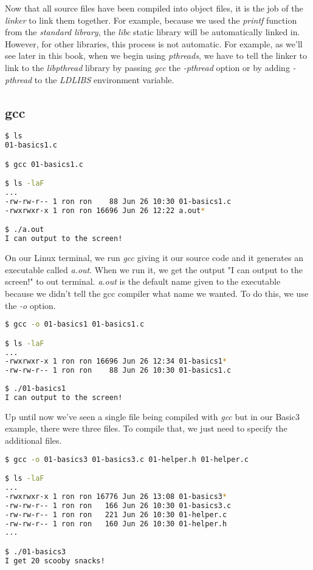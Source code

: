 \documentclass[../main.tex]{subfiles}
\begin{document}
Now that all source files have been compiled into object files, it is the job of the \textit{linker} to link them together.  For example, because we used the \textit{printf} function from the \textit{standard library}, the \textit{libc} static library will be automatically linked in.  However, for other libraries, this process is not automatic.  For example, as we'll see later in this book, when we begin using \textit{pthreads}, we have to tell the linker to link to the \textit{libpthread} library by passing \textit{gcc} the \textit{-pthread} option or by adding \textit{-pthread} to the \textit{LDLIBS} environment variable.

\subsection{gcc}


\begin{lstlisting}[language=bash, numbers=none]
$ ls
01-basics1.c

$ gcc 01-basics1.c

$ ls -laF
...
-rw-rw-r-- 1 ron ron    88 Jun 26 10:30 01-basics1.c
-rwxrwxr-x 1 ron ron 16696 Jun 26 12:22 a.out*

$ ./a.out
I can output to the screen!
\end{lstlisting}

On our Linux terminal, we run \textit{gcc} giving it our source code and it generates an executable called \textit{a.out}.  When we run it, we get the output "I can output to the screen!" to out terminal. \textit{a.out} is the default name given to the executable because we didn't tell the gcc compiler what name we wanted.  To do this, we use the \textit{-o} option.\\

\begin{lstlisting}[language=bash, numbers=none]
$ gcc -o 01-basics1 01-basics1.c

$ ls -laF
...
-rwxrwxr-x 1 ron ron 16696 Jun 26 12:34 01-basics1*
-rw-rw-r-- 1 ron ron    88 Jun 26 10:30 01-basics1.c
 
$ ./01-basics1 
I can output to the screen!
\end{lstlisting}

Up until now we've seen a single file being compiled with \textit{gcc} but in our Basic3 example, there were three files.  To compile that, we just need to specify the additional files.\\

\begin{lstlisting}[language=bash, numbers=none]
$ gcc -o 01-basics3 01-basics3.c 01-helper.h 01-helper.c 

$ ls -laF
...
-rwxrwxr-x 1 ron ron 16776 Jun 26 13:08 01-basics3*
-rw-rw-r-- 1 ron ron   166 Jun 26 10:30 01-basics3.c
-rw-rw-r-- 1 ron ron   221 Jun 26 10:30 01-helper.c
-rw-rw-r-- 1 ron ron   160 Jun 26 10:30 01-helper.h
...

$ ./01-basics3
I get 20 scooby snacks!
\end{lstlisting}
\end{document}
